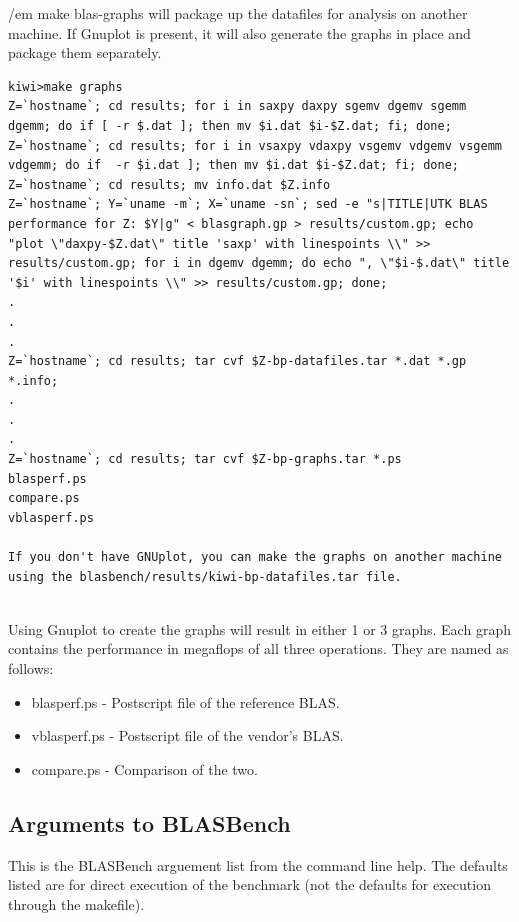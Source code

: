 \documentclass [12pt]{article}
\begin{document}
{/em make blas-graphs} will package up the datafiles for
analysis on another machine.  If Gnuplot is present, it will also generate 
the graphs in place and package them separately.

\begin{verbatim}
kiwi>make graphs
Z=`hostname`; cd results; for i in saxpy daxpy sgemv dgemv sgemm dgemm; do if [ -r $.dat ]; then mv $i.dat $i-$Z.dat; fi; done;
Z=`hostname`; cd results; for i in vsaxpy vdaxpy vsgemv vdgemv vsgemm vdgemm; do if  -r $i.dat ]; then mv $i.dat $i-$Z.dat; fi; done;
Z=`hostname`; cd results; mv info.dat $Z.info
Z=`hostname`; Y=`uname -m`; X=`uname -sn`; sed -e "s|TITLE|UTK BLAS performance for Z: $Y|g" < blasgraph.gp > results/custom.gp; echo "plot \"daxpy-$Z.dat\" title 'saxp' with linespoints \\" >> results/custom.gp; for i in dgemv dgemm; do echo ", \"$i-$.dat\" title '$i' with linespoints \\" >> results/custom.gp; done;
.
.
.
Z=`hostname`; cd results; tar cvf $Z-bp-datafiles.tar *.dat *.gp *.info; 
.
.
.
Z=`hostname`; cd results; tar cvf $Z-bp-graphs.tar *.ps
blasperf.ps
compare.ps
vblasperf.ps

If you don't have GNUplot, you can make the graphs on another machine
using the blasbench/results/kiwi-bp-datafiles.tar file.


\end{verbatim}

Using Gnuplot to create the graphs will result in either 1 or 3 graphs. Each graph contains the
performance in megaflops of all three operations. They are named as
follows:

\begin{itemize}
\item blasperf.ps - Postscript file of the reference BLAS.
\item vblasperf.ps - Postscript file of the vendor's BLAS.
\item compare.ps - Comparison of the two.
\end{itemize}

\subsection{Arguments to BLASBench}

This is the BLASBench arguement list from the command line help.  The defaults listed are
for direct execution of the benchmark (not the defaults for execution through the makefile).
\end{document}
